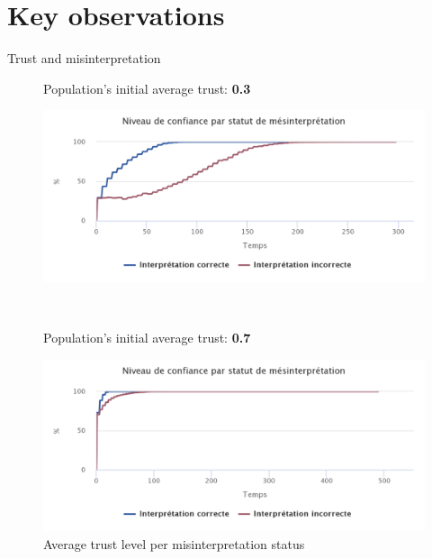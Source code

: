 \documentclass{beamer}
\begin{document}
\section{Key observations}

\begin{frame}{Trust and misinterpretation}
    \begin{figure}[htpb]
        \begin{center}
            \begin{minipage}[t]{0.3\textwidth}
                \vspace{1.5mm}
                Population's initial average trust: \textbf{0.3}
            \end{minipage}
            \begin{minipage}[t]{0.6\textwidth}
                \strut\vspace*{-\baselineskip}\newline\includegraphics[width=1.0\linewidth]{fig/trust_03_graph_trust_misint.png}
            \end{minipage}
            \\
            \begin{minipage}[t]{0.3\textwidth}
                \vspace{1.5mm}
                Population's initial average trust: \textbf{0.7}
            \end{minipage}
            \begin{minipage}[t]{0.6\textwidth}
                \strut\vspace*{-\baselineskip}\newline\includegraphics[width=1.0\linewidth]{fig/trust_07_graph_trust_misint.png}
            \end{minipage}
        \end{center}
        \caption{Average trust level per misinterpretation status}
    \end{figure}
\end{frame}
\end{document}
